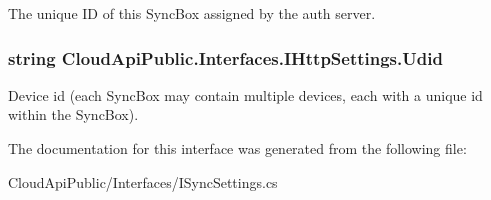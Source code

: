 The unique I\-D of this Sync\-Box assigned by the auth server. 

\hypertarget{interface_cloud_api_public_1_1_interfaces_1_1_i_http_settings_a7f318613a1276ec8f27adaa79e097f5d}{
\subsubsection[{Udid}]{\setlength{\rightskip}{0pt plus 5cm}string Cloud\-Api\-Public.\-Interfaces.\-I\-Http\-Settings.\-Udid\hspace{0.3cm}{\ttfamily [get]}}}\label{interface_cloud_api_public_1_1_interfaces_1_1_i_http_settings_a7f318613a1276ec8f27adaa79e097f5d}


Device id (each Sync\-Box may contain multiple devices, each with a unique id within the Sync\-Box). 



The documentation for this interface was generated from the following file\-:\begin{DoxyCompactItemize}
\item 
Cloud\-Api\-Public/\-Interfaces/I\-Sync\-Settings.\-cs\end{DoxyCompactItemize}
